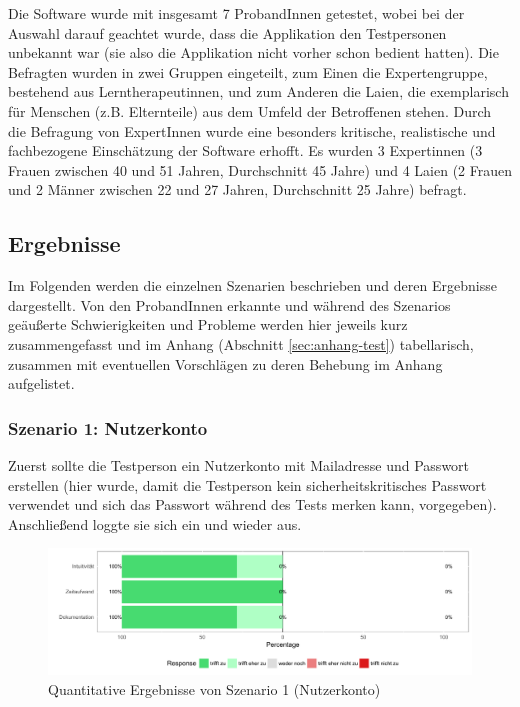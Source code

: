 Die Software wurde mit insgesamt 7 ProbandInnen getestet, wobei bei der Auswahl darauf geachtet wurde, dass die  Applikation den Testpersonen unbekannt war (sie also die Applikation nicht vorher schon bedient hatten). Die Befragten wurden in zwei Gruppen eingeteilt, zum Einen die Expertengruppe, bestehend aus Lerntherapeutinnen, und zum Anderen die Laien, die exemplarisch für Menschen (z.B. Elternteile) aus dem Umfeld der Betroffenen stehen. Durch die Befragung von ExpertInnen wurde eine besonders kritische, realistische und fachbezogene Einschätzung der Software erhofft. Es wurden 3 Expertinnen (3 Frauen zwischen 40 und 51 Jahren, Durchschnitt 45 Jahre) und 4 Laien (2 Frauen und 2 Männer zwischen 22 und 27 Jahren, Durchschnitt 25 Jahre) befragt.\\

\subsection{Ergebnisse}

Im Folgenden werden die einzelnen Szenarien beschrieben und deren Ergebnisse dargestellt. Von den ProbandInnen erkannte und während des Szenarios geäußerte Schwierigkeiten und Probleme werden hier jeweils kurz zusammengefasst und im Anhang (Abschnitt \ref{sec:anhang-test}) tabellarisch, zusammen mit eventuellen Vorschlägen zu deren Behebung im Anhang aufgelistet.

\subsubsection{Szenario 1: Nutzerkonto}

Zuerst sollte die Testperson ein Nutzerkonto mit Mailadresse und Passwort erstellen (hier wurde, damit die Testperson kein sicherheitskritisches Passwort verwendet und sich das Passwort während des Tests merken kann,  vorgegeben). Anschließend loggte sie sich ein und wieder aus.

\begin{figure}[h!]
	\centering
	\includegraphics[width=.8\linewidth]{figures/evaluation/scenario1}
	\caption{Quantitative Ergebnisse von Szenario 1 (Nutzerkonto)}
	\label{fig:evaluation-sc1}
\end{figure}

